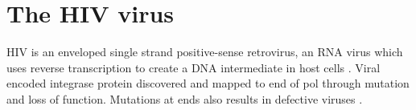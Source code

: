 \documentclass[../sherrill-Mix_thesis.tex]{subfiles}
\begin{document}





\section{The HIV virus}
HIV is an enveloped single strand positive-sense retrovirus, an RNA virus which uses reverse transcription to create a DNA intermediate in host cells \citep{Baltimore1970,Temin1970}. Viral encoded integrase protein discovered \citep{Grandgenett1978} and mapped to \threePrime{} end of pol \citep{Panganiban1984,Schwartzberg1984,Donehower1984} through mutation and loss of function.  Mutations at ends also results in defective viruses \citep{Panganiban1983}.
\end{document}
